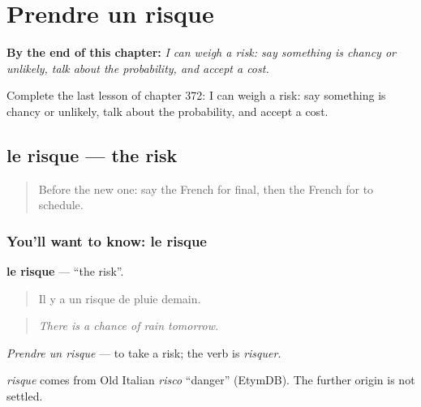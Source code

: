 
\chapter{Prendre un risque}
\label{ch:fr-prendre-un-risque}

\begin{chapteropening}
\textbf{By the end of this chapter:} \emph{I can weigh a risk: say something is chancy or unlikely, talk about the probability, and accept a cost.}

Complete the last lesson of chapter 372: I can weigh a risk: say something is chancy or unlikely, talk about the probability, and accept a cost.
\end{chapteropening}

\section[le risque]{le risque — the risk}

\label{lesson:FR-C372-risque}



\begin{quote}
Before the new one: say the French for final, then the French for to schedule.
\end{quote}

\subsection*{You'll want to know: le risque}
\textbf{le risque} — \textquotedblleft{}the risk\textquotedblright{}.

\begin{quote}
Il y a un risque de pluie demain.
\end{quote}

\begin{quote}
\emph{There is a chance of rain tomorrow.}
\end{quote}

\emph{Prendre un risque} — to take a risk; the verb is \emph{risquer}.

\begin{cousinweb}
\emph{risque} comes from Old Italian \emph{risco} \textquotedblleft{}danger\textquotedblright{} (EtymDB). The further origin is not settled.
\end{cousinweb}

